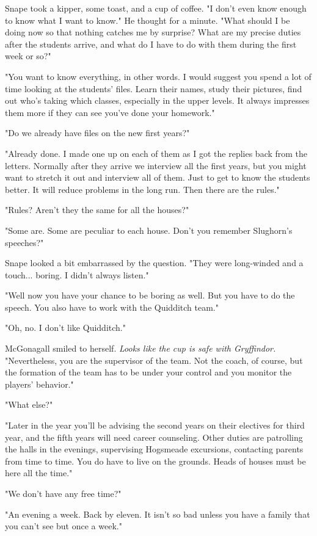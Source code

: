 \documentclass[a4paper,11pt]{article}
\begin{document}
Snape took a kipper, some toast, and a cup of coffee. "I don't even know enough to know what I want to know." He thought for a minute. "What should I be doing now so that nothing catches me by surprise? What are my precise duties after the students arrive, and what do I have to do with them during the first week or so?"

"You want to know everything, in other words. I would suggest you spend a lot of time looking at the students' files. Learn their names, study their pictures, find out who's taking which classes, especially in the upper levels. It always impresses them more if they can see you've done your homework."

"Do we already have files on the new first years?"

"Already done. I made one up on each of them as I got the replies back from the letters. Normally after they arrive we interview all the first years, but you might want to stretch it out and interview all of them. Just to get to know the students better. It will reduce problems in the long run. Then there are the rules."

"Rules? Aren't they the same for all the houses?"

"Some are. Some are peculiar to each house. Don't you remember Slughorn's speeches?"

Snape looked a bit embarrassed by the question. "They were long-winded and a touch... boring. I didn't always listen."

"Well now you have your chance to be boring as well. But you have to do the speech. You also have to work with the Quidditch team."

"Oh, no. I don't like Quidditch."

McGonagall smiled to herself. \emph{Looks like the cup is safe with Gryffindor.} "Nevertheless, you are the supervisor of the team. Not the coach, of course, but the formation of the team has to be under your control and you monitor the players' behavior."

"What else?"

"Later in the year you'll be advising the second years on their electives for third year, and the fifth years will need career counseling. Other duties are patrolling the halls in the evenings, supervising Hogsmeade excursions, contacting parents from time to time. You do have to live on the grounds. Heads of houses must be here all the time."

"We don't have any free time?"

"An evening a week. Back by eleven. It isn't so bad unless you have a family that you can't see but once a week."
\end{document}
